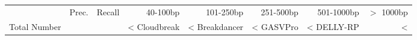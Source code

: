 \begin{table}[t]
\begin{center}
\begin{tabular}{rrr|rrrrr}
  \hline
                        & Prec. & Recall & 40-100bp  & 101-250bp  & 251-500bp & 501-1000bp & $>$ 1000bp \\ 
 Total Number &          &           & <%
  \hline
  Cloudbreak    &  <%
  Breakdancer   &  <%
  GASVPro        & <%
  DELLY-RP           & <%

\end{tabular}
\end{center}
\end{table}
